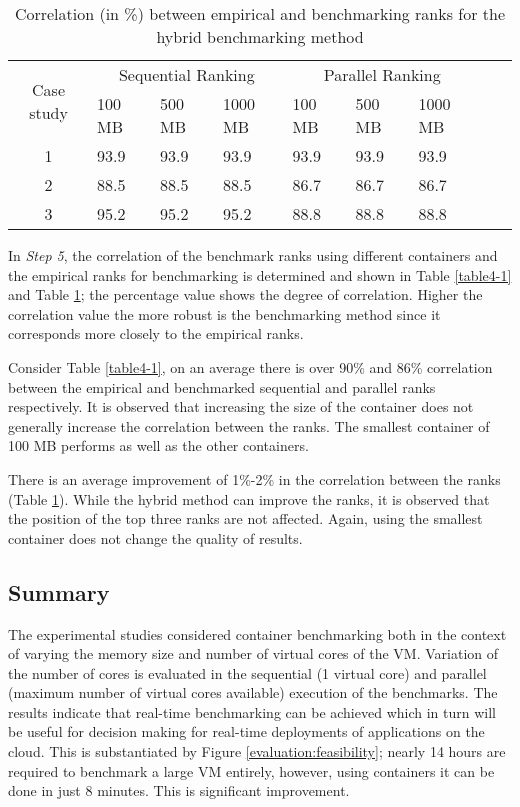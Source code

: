 \begin{table}[h]
\centering
\begin{tabular}{ |c|p{0.6cm}|p{0.6cm}|p{0.6cm}|p{0.6cm}|p{0.6cm}|p{0.6cm}|p{0.6cm}|p{0.6cm}|  }
\hline
\multirow{2}{*}{Case study} & \multicolumn{3}{|c|}{Sequential Ranking} &
\multicolumn{3}{|c|}{Parallel Ranking}\\ \cline{2-7}
& 100 MB & 500 MB & 1000 MB & 100 MB & 500 MB & 1000 MB \\
\hline
\hline
1 & 93.9 & 93.9 & 93.9 & 93.9 & 93.9 & 93.9\\
2 & 88.5 & 88.5 & 88.5 & 86.7 & 86.7 & 86.7\\
3 & 95.2 & 95.2 & 95.2 & 88.8 & 88.8 & 88.8\\
\hline
\end{tabular}
\caption{Correlation (in \%) between empirical and benchmarking ranks for the hybrid benchmarking method}
\label{table4-2}
\end{table}

In \textit{Step 5}, the correlation of the benchmark ranks using different containers and the empirical ranks for benchmarking is determined and shown in Table \ref{table4-1} and Table \ref{table4-2}; the percentage value shows the degree of correlation. Higher the correlation value the more robust is the benchmarking method since it corresponds more closely to the empirical ranks.

Consider Table \ref{table4-1}, on an average there is over 90\% and 86\% correlation between the empirical and benchmarked sequential and parallel ranks respectively. It is observed that increasing the size of the container does not generally increase the correlation between the ranks. The smallest container of 100 MB performs as well as the other containers. 

There is an average improvement of 1\%-2\% in the correlation between the ranks (Table \ref{table4-2}). While the hybrid method can improve the ranks, it is observed that the position of the top three ranks are not affected. Again, using the smallest container does not change the quality of results.   

\subsection{Summary} 
The experimental studies considered container benchmarking both in the context of varying the memory size and number of virtual cores of the VM. Variation of the number of cores is evaluated in the sequential (1 virtual core) and parallel (maximum number of virtual cores available) execution of the benchmarks. The results indicate that real-time benchmarking can be achieved which in turn will be useful for decision making for real-time deployments of applications on the cloud. This is substantiated by Figure \ref{evaluation:feasibility}; nearly 14 hours are required to benchmark a large VM entirely, however, using containers it can be done in just 8 minutes. This is significant improvement. 

